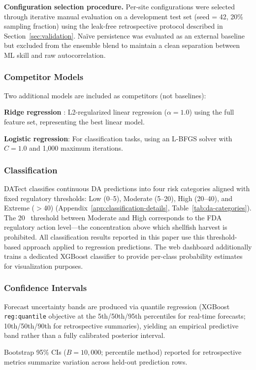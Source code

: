 \documentclass[toxins,article,submit,moreauthors]{Definitions/mdpi}
\begin{document}
\textbf{Configuration selection procedure.} Per-site configurations were selected through iterative manual evaluation on a development test set (seed = 42, 20\% sampling fraction) using the leak-free retrospective protocol described in Section~\ref{sec:validation}. Na\"ive persistence was evaluated as an external baseline but excluded from the ensemble blend to maintain a clean separation between ML skill and raw autocorrelation.

\subsubsection{Competitor Models}

Two additional models are included as competitors (not baselines):

\textbf{Ridge regression} \cite{Hoerl1970}: L2-regularized linear regression ($\alpha = 1.0$) using the full feature set, representing the best linear model.

\textbf{Logistic regression}: For classification tasks, using an L-BFGS solver with $C = 1.0$ and 1,000 maximum iterations.

\subsubsection{Classification}
\label{sec:classification}

DATect classifies continuous DA predictions into four risk categories aligned with fixed regulatory thresholds: Low (0--5), Moderate (5--20), High (20--40), and Extreme ($>$40) \si{\microgrampeg} (Appendix~\ref{app:classification-details}, Table~\ref{tab:da-categories}). The 20~\si{\microgrampeg} threshold between Moderate and High corresponds to the FDA regulatory action level---the concentration above which shellfish harvest is prohibited. All classification results reported in this paper use this threshold-based approach applied to regression predictions. The web dashboard additionally trains a dedicated XGBoost classifier to provide per-class probability estimates for visualization purposes.

\subsubsection{Confidence Intervals}

\begin{sloppypar}
Forecast uncertainty bands are produced via quantile regression \cite{Koenker1978} (XGBoost \texttt{reg:quantile} objective at the 5th/50th/95th percentiles for real-time forecasts; 10th/50th/90th for retrospective summaries), yielding an empirical predictive band rather than a fully calibrated posterior interval.
\end{sloppypar} Bootstrap 95\% CIs ($B = 10{,}000$; percentile method) reported for retrospective metrics summarize variation across held-out prediction rows.
\end{document}
